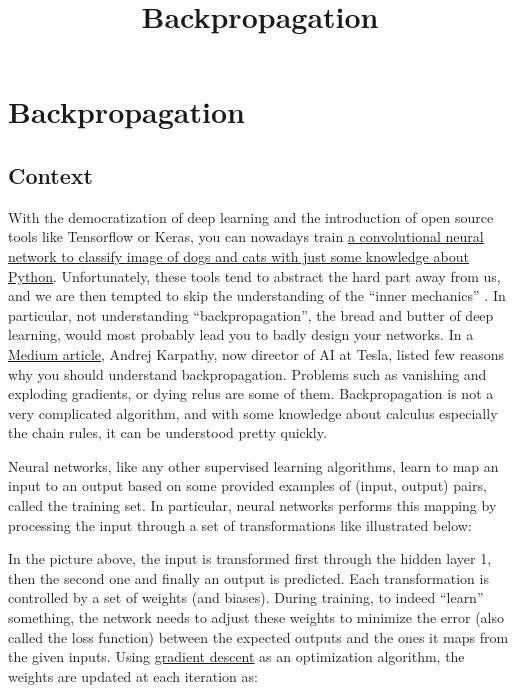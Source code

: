 \documentclass[11pt]{article}
\title{Backpropagation}
\begin{document}
    
    
    \maketitle
    
    

    
    \section{Backpropagation}\label{backpropagation}

\subsection{Context}\label{context}

With the democratization of deep learning and the introduction of open
source tools like Tensorflow or Keras, you can nowadays train
\href{https://github.com/fchollet/deep-learning-with-python-notebooks/blob/master/5.2-using-convnets-with-small-datasets.ipynb}{a
convolutional neural network to classify image of dogs and cats with
just some knowledge about Python}. Unfortunately, these tools tend to
abstract the hard part away from us, and we are then tempted to skip the
understanding of the ``inner mechanics'' . In particular, not
understanding ``backpropagation'', the bread and butter of deep
learning, would most probably lead you to badly design your networks. In
a
\href{https://medium.com/@karpathy/yes-you-should-understand-backprop-e2f06eab496b}{Medium
article}, Andrej Karpathy, now director of AI at Tesla, listed few
reasons why you should understand backpropagation. Problems such as
vanishing and exploding gradients, or dying relus are some of them.
Backpropagation is not a very complicated algorithm, and with some
knowledge about calculus especially the chain rules, it can be
understood pretty quickly.

Neural networks, like any other supervised learning algorithms, learn to
map an input to an output based on some provided examples of (input,
output) pairs, called the training set. In particular, neural networks
performs this mapping by processing the input through a set of
transformations like illustrated below:

In the picture above, the input is transformed first through the hidden
layer 1, then the second one and finally an output is predicted. Each
transformation is controlled by a set of weights (and biases). During
training, to indeed ``learn'' something, the network needs to adjust
these weights to minimize the error (also called the loss function)
between the expected outputs and the ones it maps from the given inputs.
Using \href{https://en.wikipedia.org/wiki/Gradient_descent}{gradient
descent} as an optimization algorithm, the weights are updated at each
iteration as:
\end{document}
